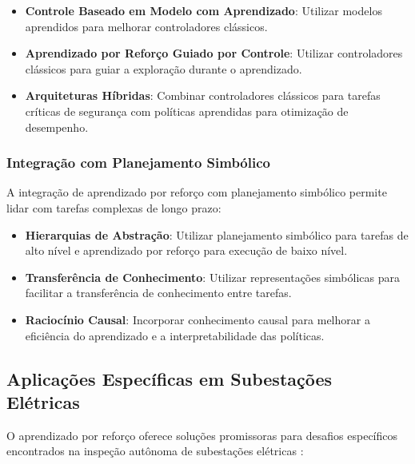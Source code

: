 \begin{itemize}
    \item \textbf{Controle Baseado em Modelo com Aprendizado}: Utilizar modelos aprendidos para melhorar controladores clássicos.
    \item \textbf{Aprendizado por Reforço Guiado por Controle}: Utilizar controladores clássicos para guiar a exploração durante o aprendizado.
    \item \textbf{Arquiteturas Híbridas}: Combinar controladores clássicos para tarefas críticas de segurança com políticas aprendidas para otimização de desempenho.
\end{itemize}

\subsubsection{Integração com Planejamento Simbólico}

A integração de aprendizado por reforço com planejamento simbólico permite lidar com tarefas complexas de longo prazo:

\begin{itemize}
    \item \textbf{Hierarquias de Abstração}: Utilizar planejamento simbólico para tarefas de alto nível e aprendizado por reforço para execução de baixo nível.
    \item \textbf{Transferência de Conhecimento}: Utilizar representações simbólicas para facilitar a transferência de conhecimento entre tarefas.
    \item \textbf{Raciocínio Causal}: Incorporar conhecimento causal para melhorar a eficiência do aprendizado e a interpretabilidade das políticas.
\end{itemize}

\subsection{Aplicações Específicas em Subestações Elétricas}

O aprendizado por reforço oferece soluções promissoras para desafios específicos encontrados na inspeção autônoma de subestações elétricas \cite{Tai2024AutonomousRL, Kim2023MultimodalFusion}:

